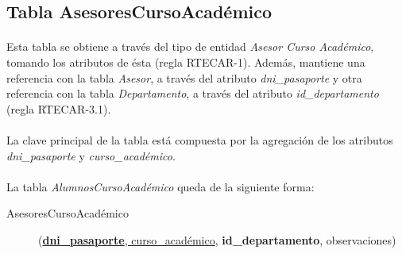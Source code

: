    \subsection{Tabla AsesoresCursoAcadémico}

      \paragraph{}Esta tabla se obtiene a través del tipo de entidad
      \textit{Asesor Curso Académico}, tomando los atributos de ésta (regla
      RTECAR-1). Además, mantiene una referencia con la tabla \textit{Asesor}, a
      través del atributo \textit{dni\_pasaporte} y otra referencia con la tabla
      \textit{Departamento}, a través del atributo \textit{id\_departamento}
      (regla RTECAR-3.1).

      \paragraph{}La clave principal de la tabla está compuesta por la
      agregación de los atributos \textit{dni\_pasaporte} y
      \textit{curso\_académico}.

      \paragraph{}La tabla \textit{AlumnosCursoAcadémico} queda de la siguiente
      forma:

      \begin{description}
         \item[AsesoresCursoAcadémico] \begin{flushleft}(\underline{\textbf{dni\_pasaporte},
         curso\_académico}, \textbf{id\_departamento}, observaciones)\end{flushleft}
      \end{description}
